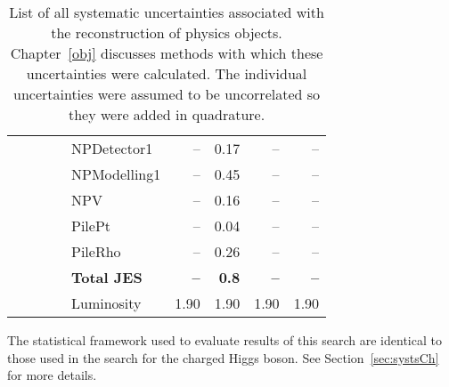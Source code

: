 \begin{table}
{\begin{tabular}{|lllll|rrrr|}
														& & & &  NPDetector1						& --  	  & 0.17  	  & --  	  & --  	  \\ 

														& & & &  NPModelling1						& --  	  & 0.45  	  & --  	  & --  	 \\

														& & & &  NPV										& --  	  & 0.16  	  & --  	  & --  	 \\

														& & & &  PilePt									& --  	  & 0.04  	  & --  	  & --  	 \\

                          	& & & &  PileRho								& --  	  & 0.26  	  & --  	  & --  	 \\
\hline
														& & & &  \textbf{Total JES}              & \textbf{--}			& \textbf{0.8}      & \textbf{--}      & \textbf{--}     \\ 
\hline											& & & & Luminosity							& 1.90      & 1.90      & 1.90      & 1.90      \\
\hline
\end{tabular}
}
\caption{List of all systematic uncertainties associated with the reconstruction of physics objects. Chapter~\ref{obj} 
discusses methods with which these uncertainties were calculated. The individual uncertainties were assumed to be 
uncorrelated so they were added in quadrature.}
\label{tab:systs}
\end{table}

\par The statistical framework used to evaluate results of this search are identical to those used in the 
search for the charged Higgs boson. See Section~\ref{sec:systsCh} for more details.  
